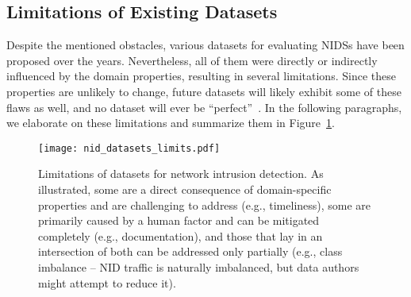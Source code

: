 \subsection{Limitations of Existing Datasets}
\label{ssec:domain_specs_limitations}

Despite the mentioned obstacles, various datasets for evaluating NIDSs have been proposed over the years. Nevertheless, all of them were directly or indirectly influenced by the domain properties, resulting in several limitations. Since these properties are unlikely to change, future datasets will likely exhibit some of these flaws as well, and no dataset will ever be ``perfect''~\cite{ring2019_nids_datasets_survey}. In the following paragraphs, we elaborate on these limitations and summarize them in Figure~\ref{fig:nid_data_limits}.

\begin{figure}[t]
    \centering
    \texttt{[image: nid\_datasets\_limits.pdf]}
    \caption{Limitations of datasets for network intrusion detection. As illustrated, some are a direct consequence of domain-specific properties and are challenging to address (e.g., timeliness), some are primarily caused by a human factor and can be mitigated completely (e.g., documentation), and those that lay in an intersection of both can be addressed only partially (e.g., class imbalance -- NID traffic is naturally imbalanced, but data authors might attempt to reduce it).}
    \label{fig:nid_data_limits}
\end{figure}

